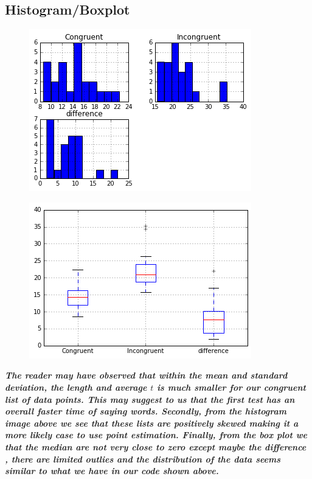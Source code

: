 \documentclass[8pt]{article}
\newcommand{\8}{\bar}
\begin{document}
\subsection{Histogram/Boxplot} 
\begin{figure}[H]
	\includegraphics{histogram.png}
\end{figure}
\begin{figure}[H]
	\includegraphics{box_plot.png}
\end{figure}


\noindent \textbf{\textit{The reader may have observed that within the mean and standard deviation, the length and average $t$ is much smaller for our congruent list of data points. This may suggest to us that the first test has an overall faster time of saying words. Secondly, from the histogram image above we see that these lists are positively skewed making it a more likely case to use point estimation. Finally, from the box plot we that the median are not very close to zero except maybe the difference , there are limited outlies and the distribution of the data seems similar to what we have in our code shown above.}} 
\end{document}
